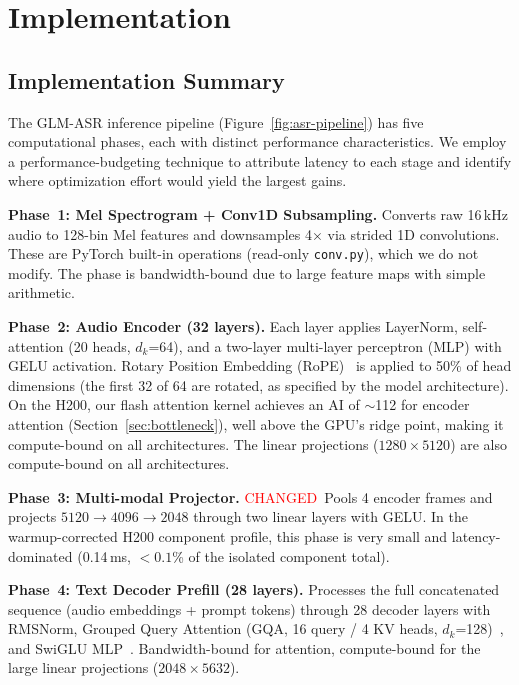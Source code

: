 \documentclass{article}
\newcommand{\chg}[1]{{\color{blue}#1}}
\newcommand{\chglabel}{{\setlength{\fboxsep}{1pt}\colorbox{yellow!45}{\textcolor{red}{\scriptsize CHANGED}}}}
\begin{document}
\section{Implementation}\label{sec:implementation}

\subsection{Implementation Summary}

The GLM-ASR inference pipeline (Figure~\ref{fig:asr-pipeline}) has five computational phases, each with distinct performance characteristics.
We employ a performance-budgeting technique to attribute latency to each stage and identify where optimization effort would yield the largest gains.

\textbf{Phase~1: Mel Spectrogram + Conv1D Subsampling.}
Converts raw 16\,kHz audio to 128-bin Mel features and downsamples 4$\times$ via strided 1D convolutions.  These are PyTorch built-in operations (read-only \texttt{conv.py}), which we do not modify.  The phase is bandwidth-bound due to large feature maps with simple arithmetic.

\textbf{Phase~2: Audio Encoder (32 layers).}
Each layer applies LayerNorm, self-attention (20 heads, $d_k$=64), and a two-layer multi-layer perceptron (MLP) with GELU activation.  Rotary Position Embedding (RoPE)~\citep{su2024roformer} is applied to 50\% of head dimensions (the first 32 of 64 are rotated, as specified by the model architecture).  On the H200, our flash attention kernel achieves an AI of $\sim$112 for encoder attention (Section~\ref{sec:bottleneck}), well above the GPU's ridge point, making it compute-bound on all architectures.  The linear projections ($1280 \times 5120$) are also compute-bound on all architectures.

\textbf{Phase~3: Multi-modal Projector.}
\chglabel\ \chg{Pools 4 encoder frames and projects $5120 \to 4096 \to 2048$ through two linear layers with GELU.  In the warmup-corrected H200 component profile, this phase is very small and latency-dominated (0.14\,ms, $<0.1$\% of the isolated component total).}

\textbf{Phase~4: Text Decoder Prefill (28 layers).}
Processes the full concatenated sequence (audio embeddings + prompt tokens) through 28 decoder layers with RMSNorm, Grouped Query Attention (GQA, 16 query / 4 KV heads, $d_k$=128)~\citep{ainslie2023gqa}, and SwiGLU MLP~\citep{shazeer2020glu}.  Bandwidth-bound for attention, compute-bound for the large linear projections ($2048 \times 5632$).
\end{document}
